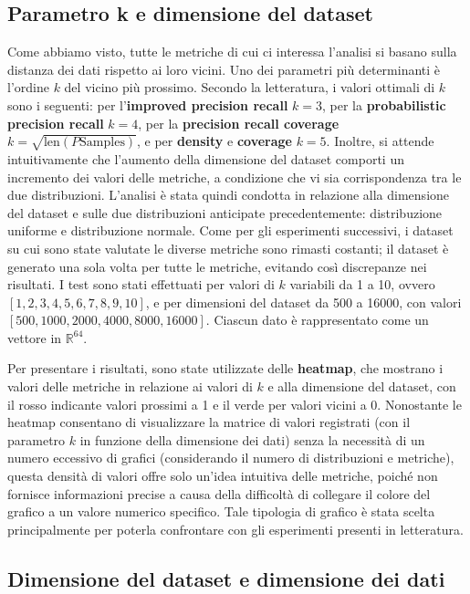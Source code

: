 \subsection{Parametro k e dimensione del dataset}

Come abbiamo visto, tutte le metriche di cui ci interessa l'analisi si basano sulla distanza dei dati rispetto ai loro vicini. Uno dei parametri più determinanti è l'ordine \( k \) del vicino più prossimo. Secondo la letteratura, i valori ottimali di \( k \) sono i seguenti: per l'\textbf{improved precision recall} \( k=3 \), per la \textbf{probabilistic precision recall} \( k=4 \), per la \textbf{precision recall coverage} \( k=\sqrt{\text{len}(P\text{Samples})} \), e per \textbf{density} e \textbf{coverage} \( k=5 \). Inoltre, si attende intuitivamente che l'aumento della dimensione del dataset comporti un incremento dei valori delle metriche, a condizione che vi sia corrispondenza tra le due distribuzioni.
L'analisi è stata quindi condotta in relazione alla dimensione del dataset e sulle due distribuzioni anticipate precedentemente: distribuzione uniforme e distribuzione normale. Come per gli esperimenti successivi, i dataset su cui sono state valutate le diverse metriche sono rimasti costanti; il dataset è generato una sola volta per tutte le metriche, evitando così discrepanze nei risultati.
I test sono stati effettuati per valori di \( k \) variabili da 1 a 10, ovvero \([1, 2, 3, 4, 5, 6, 7, 8, 9, 10]\), e per dimensioni del dataset da 500 a 16000, con valori \([500, 1000, 2000, 4000, 8000, 16000]\). Ciascun dato è rappresentato come un vettore in \( \mathbb{R}^{64} \).

Per presentare i risultati, sono state utilizzate delle \textbf{heatmap}, che mostrano i valori delle metriche in relazione ai valori di \( k \) e alla dimensione del dataset, con il rosso indicante valori prossimi a 1 e il verde per valori vicini a 0. 
Nonostante le heatmap consentano di visualizzare la matrice di valori registrati (con il parametro \( k \) in funzione della dimensione dei dati) senza la necessità di un numero eccessivo di grafici (considerando il numero di distribuzioni e metriche), questa densità di valori offre solo un'idea intuitiva delle metriche, poiché non fornisce informazioni precise a causa della difficoltà di collegare il colore del grafico a un valore numerico specifico. Tale tipologia di grafico è stata scelta principalmente per poterla confrontare con gli esperimenti presenti in letteratura.

\subsection{Dimensione del dataset e dimensione dei dati}

